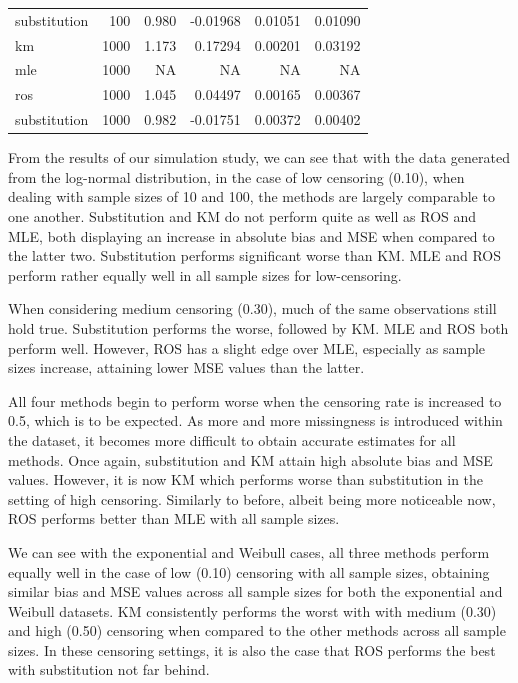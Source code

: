 \documentclass[12pt, twoside]{amherstthesis}
\begin{document}
\begin{table}
\begin{tabular}[t]{lrrrrr}
\hspace{1em}substitution & 100 & 0.980 & -0.01968 & 0.01051 & 0.01090\\
\hspace{1em}km & 1000 & 1.173 & 0.17294 & 0.00201 & 0.03192\\
\hspace{1em}mle & 1000 & NA & NA & NA & NA\\
\hspace{1em}ros & 1000 & 1.045 & 0.04497 & 0.00165 & 0.00367\\
\hspace{1em}substitution & 1000 & 0.982 & -0.01751 & 0.00372 & 0.00402\\
\bottomrule
\end{tabular}
\end{table}
From the results of our simulation study, we can see that with the data generated from the log-normal distribution, in the case of low censoring (0.10), when dealing with sample sizes of 10 and 100, the methods are largely comparable to one another. Substitution and KM do not perform quite as well as ROS and MLE, both displaying an increase in absolute bias and MSE when compared to the latter two. Substitution performs significant worse than KM. MLE and ROS perform rather equally well in all sample sizes for low-censoring.

When considering medium censoring (0.30), much of the same observations still hold true. Substitution performs the worse, followed by KM. MLE and ROS both perform well. However, ROS has a slight edge over MLE, especially as sample sizes increase, attaining lower MSE values than the latter.

All four methods begin to perform worse when the censoring rate is increased to 0.5, which is to be expected. As more and more missingness is introduced within the dataset, it becomes more difficult to obtain accurate estimates for all methods. Once again, substitution and KM attain high absolute bias and MSE values. However, it is now KM which performs worse than substitution in the setting of high censoring. Similarly to before, albeit being more noticeable now, ROS performs better than MLE with all sample sizes.

We can see with the exponential and Weibull cases, all three methods perform equally well in the case of low (0.10) censoring with all sample sizes, obtaining similar bias and MSE values across all sample sizes for both the exponential and Weibull datasets. KM consistently performs the worst with with medium (0.30) and high (0.50) censoring when compared to the other methods across all sample sizes. In these censoring settings, it is also the case that ROS performs the best with substitution not far behind.
\end{document}
